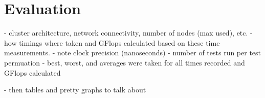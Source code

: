 \section{Evaluation}\label{sec:dspmv-evaluation}

- cluster architecture, network connectivity, number of nodes (max used), etc.
- how timings where taken and GFlops calculated based on these time measurements. 
	- note clock precision (nanoseconds)
- number of tests run per test permuation
	- best, worst, and averages were taken for all times recorded and GFlops calculated
	
- then tables and pretty graphs to talk about 
